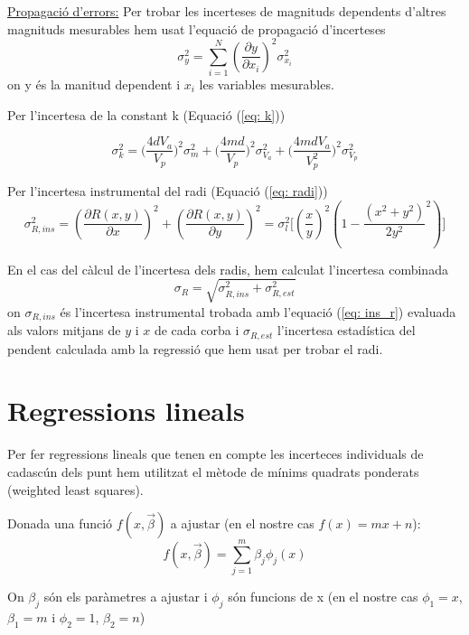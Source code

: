\documentclass[11pt]{article}
\begin{document}
\underline{Propagació d'errors:} Per trobar les incerteses de magnituds dependents d'altres magnituds mesurables hem usat l'equació de propagació d'incerteses
\begin{equation}
    \sigma_{y}^2=\sum_{i=1}^{N}(\frac{\partial y}{\partial x_i})^2\sigma_{x_i}^2
\end{equation}
on y és la manitud dependent i ${x_i}$ les variables mesurables.

Per l'incertesa de la constant k (Equació (\ref{eq: k}))

 \begin{equation}
     \sigma^2_k=\bigg(\frac{4dV_a}{V_p}\bigg)^2\sigma_m^2 + \bigg(\frac{4md}{V_p}\bigg)^2\sigma_{V_a}^2+\bigg(\frac{4mdV_a}{V_p^2}\bigg)^2\sigma_{V_p}^2
 \end{equation}

Per l'incertesa instrumental del radi (Equació (\ref{eq: radi}))
\begin{equation}
    \sigma_{R,ins}^2 = (\frac{\partial R(x,y)}{\partial x})^2+(\frac{\partial R(x,y)}{\partial y})^2= \sigma_{l}^2\bigg[(\frac{x}{y})^2(1-\frac{(x^2+y^2)}{2y^2}^2)\bigg]
    \label{eq: ins_r}
\end{equation}

En el cas del càlcul de l'incertesa dels radis, hem calculat l'incertesa combinada 
\begin{equation}
    \sigma_{R}=\sqrt{\sigma_{R,ins}^2+\sigma_{R,est}^2}
\end{equation}
on $\sigma_{R,ins}$ és l'incertesa instrumental trobada amb l'equació (\ref{eq: ins_r}) evaluada als valors mitjans de $y$ i $x$ de cada corba i $\sigma_{R,est}$ l'incertesa estadística del pendent calculada amb la regressió que hem usat per trobar el radi.

\section{Regressions lineals} \label{sec: Reg}

 Per fer regressions lineals que tenen en compte les incerteces individuals de cadascún dels punt hem utilitzat el mètode de mínims quadrats ponderats (weighted least squares).
 
 Donada una funció $f(x,\vec{\beta})$ a ajustar (en el nostre cas $f(x) = mx+n$):
 \begin{equation}
     f(x,\vec{\beta}) = \sum_{j=1}^m\beta_j\phi_j(x)
 \end{equation}
 
  On ${\beta_j}$ són els paràmetres a ajustar i $\phi_j$ són funcions de x (en el nostre cas $\phi_1 = x$, $\beta_1 = m$ i $\phi_2 = 1$, $\beta_2 = n$)
 
\end{document}
